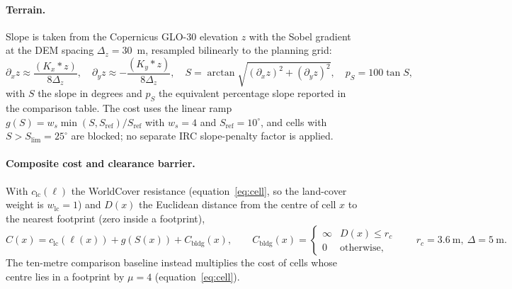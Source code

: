 \documentclass[12pt,a4paper]{article}
\begin{document}
\paragraph{Terrain.} Slope is taken from the Copernicus GLO-30 elevation $z$ with the Sobel gradient at the DEM spacing $\Delta_z=30$~m, resampled bilinearly to the planning grid:
\begin{equation}
\partial_x z\approx\frac{(K_x{*}z)}{8\Delta_z},\quad \partial_y z\approx-\frac{(K_y{*}z)}{8\Delta_z},\quad S=\arctan\sqrt{(\partial_x z)^2+(\partial_y z)^2},\quad p_S=100\tan S,
\label{eq:slope}
\end{equation}
with $S$ the slope in degrees and $p_S$ the equivalent percentage slope reported in the comparison table. The cost uses the linear ramp $g(S)=w_s\min(S,S_{\mathrm{ref}})/S_{\mathrm{ref}}$ with $w_s=4$ and $S_{\mathrm{ref}}=10^{\circ}$, and cells with $S>S_{\lim}=25^{\circ}$ are blocked; no separate IRC slope-penalty factor is applied.

\paragraph{Composite cost and clearance barrier.} With $c_{\mathrm{lc}}(\ell)$ the WorldCover resistance (equation~\ref{eq:cell}, so the land-cover weight is $w_{\mathrm{lc}}=1$) and $D(x)$ the Euclidean distance from the centre of cell $x$ to the nearest footprint (zero inside a footprint),
\begin{equation}
C(x)=c_{\mathrm{lc}}(\ell(x))+g(S(x))+C_{\mathrm{bldg}}(x),\qquad C_{\mathrm{bldg}}(x)=\begin{cases}\infty & D(x)\le r_c\\ 0 & \text{otherwise,}\end{cases}\qquad r_c=3.6\ \mathrm{m},\ \Delta=5\ \mathrm{m}.
\label{eq:bldg}
\end{equation}
The ten-metre comparison baseline instead multiplies the cost of cells whose centre lies in a footprint by $\mu=4$ (equation~\ref{eq:cell}).
\end{document}
